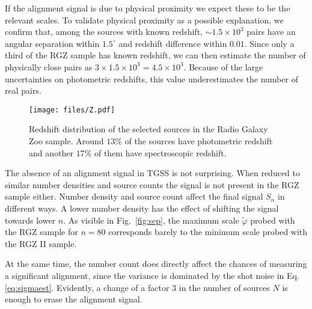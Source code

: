 	If the alignment signal is due to physical proximity we expect these to be the relevant scales. To validate physical proximity as a possible explanation, we confirm that, among the sources with known redshift, $\sim1.5\times10^3$ pairs have an angular separation within $1.5^\circ$ and redshift difference within $0.01$. Since only a third of the RGZ sample has known redshift, we can then estimate the number of physically close pairs as $3\times1.5\times10^3 = 4.5\times10^3$. Because of the large uncertainties on photometric redshifts, this value underestimates the number of real pairs.
	


		\begin{figure}
			\centering
			\texttt{[image: files/Z.pdf]}
			\caption{Redshift distribution of the selected sources in the Radio Galaxy Zoo sample. Around $13\%$ of the sources have photometric redshift and another $17\%$ of them have spectroscopic redshift. }
			\label{fig:z}
		\end{figure}	


	The absence of an alignment signal in TGSS is not surprising. When reduced to similar number densities and source counts the signal is not present in the RGZ sample either.	Number density and source count affect the final signal $S_n$ in different ways. 
	A lower number density has the effect of shifting the signal towards lower $n$. As visible in Fig.~\ref{fig:sep}, the maximum scale $\tilde{\varphi}$ probed with the RGZ sample for $n=80$ corresponds barely to the minimum scale probed with the RGZ II sample.
	
	At the same time, the number count does directly affect the chances of measuring a significant alignment, since the variance is dominated by the shot noise in Eq. \eqref{eq:sigmaest}. Evidently, a change of a factor $3$ in the number of sources $N$ is enough to erase the alignment signal.
	
